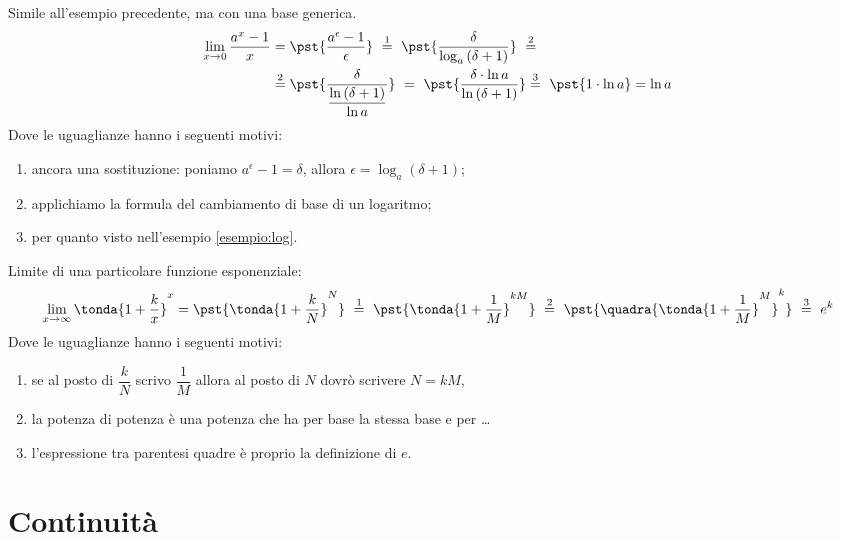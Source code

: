 \begin{esempio}
Simile all'esempio precedente, ma con una base generica.
\begin{align*}
\lim_{x \rightarrow 0} \dfrac{a^x-1}{x} &=
\pst{\dfrac{a^\epsilon-1}{\epsilon}}
~ \stackrel{1}{=} ~  
\pst{\dfrac{\delta}{\log_a{(\delta+1)}}}~ \stackrel{2}{=}\\
&\stackrel{2}{=} 
\pst{\frac{\delta}{\dfrac{\ln{(\delta+1)}}{\ln a}}} ~=~
\pst{\frac{\delta \cdot \ln a}{\ln{(\delta+1)}}} %
\stackrel{3}{=} ~ 
\pst{1 \cdot \ln a}=\ln{a}
\end{align*}
\newpage   %
Dove le uguaglianze hanno i seguenti motivi:
\begin{enumerate} [nosep]
 \item ancora una sostituzione: poniamo
\(a^\epsilon-1=\delta\), allora \(\epsilon=\log_a(\delta+1)\);
 \item applichiamo la formula del cambiamento di base di un logaritmo; 
 \item per quanto visto nell'esempio \ref{esempio:log}.
\end{enumerate}
\end{esempio}

\begin{esempio}
Limite di una particolare funzione esponenziale:
\begin{align*}
 \lim_{x \rightarrow \infty} \tonda{1+\dfrac{k}{x}}^x =
 \pst{\tonda{1+\dfrac{k}{N}}^N}
~ \stackrel{1}{=} ~  
\pst{\tonda{1+\dfrac{1}{M}}^{kM}}
~ \stackrel{2}{=} ~
\pst{\quadra{\tonda{1+\dfrac{1}{M}}^M}^k}
~ \stackrel{3}{=} ~ e^k
\end{align*}
Dove le uguaglianze hanno i seguenti motivi:
\begin{enumerate} [nosep]
 \item se al posto di \(\dfrac{k}{N}\) scrivo \(\dfrac{1}{M}\) 
allora al posto di \(N\) dovrò scrivere \(N=kM\), 
 \item la potenza di potenza è una potenza che ha per base la stessa base 
e per \dots
 \item l'espressione tra parentesi quadre è proprio la definizione di \(e\).
\end{enumerate}
\end{esempio}


\section{Continuità}
\label{sec:cont_continuita}

